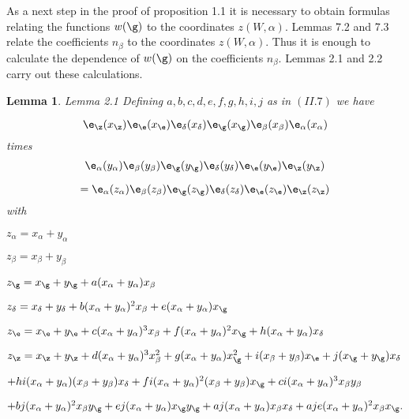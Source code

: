 \documentclass{memo-l}
\newtheorem{lemma}[theorem]{Lemma}
\theoremstyle{definition}
\theoremstyle{remark}
\numberwithin{section}{chapter}
\numberwithin{equation}{chapter}
\begin{document}
   As a next step in the proof of proposition 1.1 it is necessary to obtain
formulas relating the functions $w({\g})$ to the coordinates
$z(W,{\alpha})$.   Lemmas 7.2 and 7.3 relate the coefficients $n_{\beta}$
to the coordinates $z(W,{\alpha})$.
 Thus it is enough to calculate the dependence of $w({\g})$ on the
coefficients $n_{\beta}$.
  Lemmas 2.1 and 2.2 carry out these calculations.

\medpagebreak

\begin{lemma}{Lemma 2.1}   Defining $a,b,c,d,e,f,g,h,i,j$ as in $(II.7)$ we have

$${\e}_{{\z}}(x_{{\z}}){\e}_{{\e}}(x_{{\e}})
{\e}_{{\delta}}(x_{{\delta}}){\e}_{{\g}}(x_{{\g}})
{\e}_{\beta}(x_{\beta}){\e}_{\alpha}(x_{\alpha})
$$  times      $$ {\e}_{\alpha}(y_{{\alpha }}){\e}_{\beta}(y_{\beta})
{\e}_{{\g}}(y_{{\g}}){\e}_{{\delta}}(y_{{\delta}})
{\e}_{{\e}}(y_{{\e}}){\e}_{{\z}}(y_\z)$$

$$
= {\e}_{\alpha}(z_{\alpha}){\e}_{\beta}(z_{\beta})
{\e}_{{\g}}(z_{{\g}}){\e}_{{\delta}}(z_{{\delta}})
{\e}_{{\e}}(z_{{\e}}){\e}_{{\z}}(z_{{\z}})
$$
with

\noindent
$z_{\alpha} = x_{\alpha}+y_{\alpha}$

\noindent
$z_{\beta} = x_{\beta}+y_{\beta}$

\noindent
$z_{{\g}} = x_{{\g}}+y_{{\g}} + a(x_{\alpha}+y_{\alpha})
x_{\beta}$

\noindent
$z_{{\delta}} = x_{{\delta}}+y_{{\delta}} + b(x_{\alpha}+y_{\alpha})^{2}
x_{\beta} + e(x_{\alpha}+y_{\alpha})x_{{\g}}$

\noindent
$z_{{\e}} = x_{{\e}}+y_{{\e}} + c(x_{\alpha}+
y_{\alpha})^{3}x_{\beta} + f(x_{\alpha}+y_{\alpha})^{2}x_{{\g}} +
h(x_{\alpha}+y_{\alpha})x_{{\delta}}$

\noindent
$z_{{\z}} = x_{{\z}}+y_{{\z}} + d(x_{\alpha}+y_{\alpha})^{3}
x_{\beta}^{2} + g(x_{\alpha}+y_{\alpha})x_{{\g}}^{2} + i(x_{\beta}
+y_{\beta})x_{{\e}} + j(x_{{\g}}+y_{{\g}})x_{{\delta}}$

   $+ hi(x_{\alpha}+y_{\alpha})(x_{\beta}+y_{\beta})x_{{\delta}} +
fi(x_{\alpha}+y_{\alpha})^{2}(x_{\beta}+y_{\beta})x_{{\g}} +
ci(x_{\alpha}+y_{\alpha})^{3}x_{\beta}y_{\beta}$

   $+ bj(x_{\alpha}+y_{\alpha})^{2}x_{\beta}y_{{\g}} +
ej(x_{\alpha}+y_{\alpha})x_{{\g}}y_{{\g}} + aj(x_{\alpha}+
y_{\alpha})x_{\beta}x_{{\delta}} + aje(x_{\alpha}+y_{\alpha})^{2}
x_{\beta}x_{{\g}}.$
\end{lemma}
\end{document}
